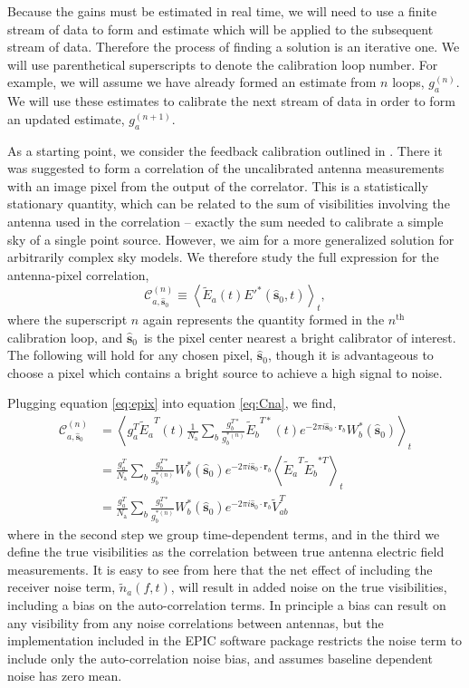 \documentclass[a4paper,fleqn,usenatbib]{mnras}
\newcommand{\Nant}{\ensuremath{N_{\mathrm{a}}}}
\newcommand{\spix}{\ensuremath{\hat{\mathbf{s}}_{0}}}
\newcommand{\Cna}[1][n]{\ensuremath{\mathcal{C}^{(#1)}_{a,\spix}}}
\newcommand{\rb}{\ensuremath{\mathbf{r}_b}}
\newcommand{\beamtheta}{\ensuremath{W}}
\newcommand{\Er}[1]{\ensuremath{\widetilde{E}_{#1}}}
\newcommand{\V}{\ensuremath{\widetilde{V}}}
\begin{document}
Because the gains must be estimated in real time, we will need to use a finite stream of data to form and estimate which will be applied to the subsequent stream of data. Therefore the process of finding a solution is an iterative one. We will use parenthetical superscripts to denote the calibration loop number. For example, we will assume we have already formed an estimate from $n$ loops, $g^{(n)}_a$. We will use these estimates to calibrate the next stream of data in order to form an updated estimate, $g^{(n+1)}_a$.

As a starting point, we consider the feedback calibration outlined in \citealt{mor11}. There it was suggested to form a correlation of the uncalibrated antenna measurements with an image pixel from the output of the correlator. This is a statistically stationary quantity, which can be related to the sum of visibilities involving the antenna used in the correlation -- exactly the sum needed to calibrate a simple sky of a single point source. However, we aim for a more generalized solution for arbitrarily complex sky models. We therefore study the full expression for the antenna-pixel correlation,
\begin{equation}\label{eq:Cna}
\Cna \equiv \left<\Er{a}(t) E'^*(\spix,t)\right>_t,
\end{equation}
where the superscript $n$ again represents the quantity formed in the $n^\mathrm{th}$ calibration loop, and \spix\, is the pixel center nearest a bright calibrator of interest. The following will hold for any chosen pixel, \spix, though it is advantageous to choose a pixel which contains a bright source to achieve a high signal to noise. 

Plugging equation \ref{eq:epix} into equation \ref{eq:Cna}, we find,
\begin{align}\label{eq:cna}
\Cna & = \left<g^T_a \Er{a}^T(t) \frac{1}{\Nant} \sum_b \frac{g^{T*}_b}{g^{*(n)}_b}\Er{b}^{T*}(t) e^{-2\pi i \spix \cdot \rb} \beamtheta^*_b(\spix)\right>_t \nonumber \\
& = \frac{g^T_a}{\Nant} \sum_b \frac{g^{T*}_b}{g^{*(n)}_b} \beamtheta^*_b(\spix) e^{-2\pi i \spix \cdot \rb} \left<\Er{a}^T \Er{b}^{*T} \right>_t \nonumber \\
& = \frac{g^T_a}{\Nant} \sum_b \frac{g^{T*}_b}{g^{*(n)}_b} \beamtheta^*_b(\spix) e^{-2\pi i \spix \cdot \rb} \V^T_{ab}
\end{align}
where in the second step we group time-dependent terms, and in the third we define the true visibilities as the correlation between true antenna electric field measurements. It is easy to see from here that the net effect of including the receiver noise term, $\widetilde{n}_a(f,t)$, will result in added noise on the true visibilities, including a bias on the auto-correlation terms. In principle a bias can result on any visibility from any noise correlations between antennas, but the implementation included in the EPIC software package restricts the noise term to include only the auto-correlation noise bias, and assumes baseline dependent noise has zero mean.
\end{document}
